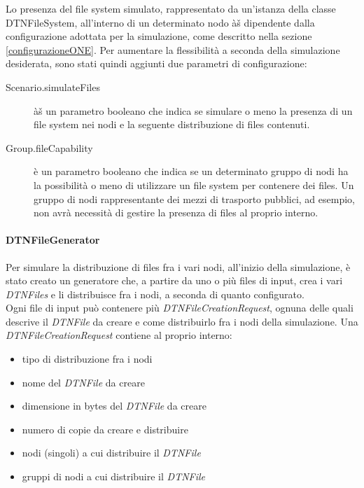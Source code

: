 Lo presenza del file system simulato, rappresentato da un'istanza della classe DTNFileSystem, all'interno di un determinato nodo àš dipendente dalla configurazione adottata per la simulazione, come descritto nella sezione \ref{configurazioneONE}. Per aumentare la flessibilità  a seconda della simulazione desiderata, sono stati quindi aggiunti due parametri di configurazione:
\begin{description}
\item[Scenario.simulateFiles] àš un parametro booleano che indica se simulare o meno la presenza di un file system nei nodi e la seguente distribuzione di files contenuti.
\item[Group.fileCapability] è un parametro booleano che indica se un determinato gruppo di nodi ha la possibilità  o meno di utilizzare un file system per contenere dei files. Un gruppo di nodi rappresentante dei mezzi di trasporto pubblici, ad esempio, non avrà  necessità  di gestire la presenza di files al proprio interno.
\end{description}

\paragraph{DTNFileGenerator}
\label{fileGeneratorImplementazione}
Per simulare la distribuzione di files fra i vari nodi, all'inizio della simulazione, è stato creato un generatore che, a partire da uno o più files di input, crea i vari \textit{DTNFiles} e li distribuisce fra i nodi, a seconda di quanto configurato.
\\
Ogni file di input può contenere più \textit{DTNFileCreationRequest}, ognuna delle quali descrive il \textit{DTNFile} da creare e come distribuirlo fra i nodi della simulazione. Una \textit{DTNFileCreationRequest} contiene al proprio interno:
\begin{itemize}
\item tipo di distribuzione fra i nodi
\item nome del \textit{DTNFile} da creare
\item dimensione in bytes del \textit{DTNFile} da creare
\item numero di copie da creare e distribuire
\item nodi (singoli) a cui distribuire il \textit{DTNFile}
\item gruppi di nodi a cui distribuire il \textit{DTNFile}
\end{itemize}


